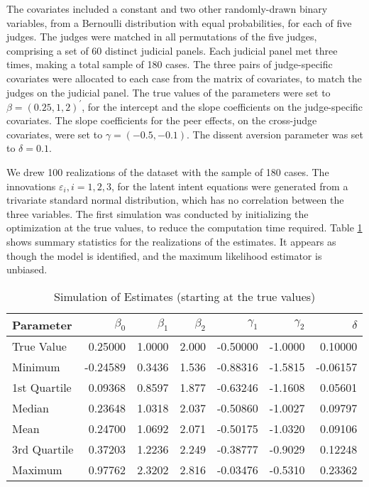 \documentclass[11pt]{paper}
\begin{document}
The covariates included a constant and two other randomly-drawn 
binary variables, from a Bernoulli distribution with equal probabilities, 
for each of five judges. 
The judges were matched in all permutations of the five judges, 
comprising a set of 60 distinct judicial panels. 
Each judicial panel met three times, making a total sample of 180 cases. 
The three pairs of judge-specific covariates were allocated to each case from
the matrix of covariates, to match the judges on the judicial panel. 
The true values of the parameters were set to
$\beta = (0.25, 1, 2)^{\prime}$, for the intercept 
and the slope coefficients on the judge-specific covariates. 
The slope coefficients for the peer effects, on the cross-judge covariates, 
were set to $\gamma = (-0.5, -0.1)$. 
The dissent aversion parameter was set to $\delta = 0.1$. 

We drew 100 realizations of the dataset with the sample of 180 cases.
The innovations $\varepsilon_i, i = 1, 2, 3$, for the latent intent equations
were generated from a trivariate standard normal distribution, 
which has no correlation between the three variables. 
The first simulation was conducted by 
initializing the optimization at the true values, 
to reduce the computation time required. 
Table \ref{tab:sim_warm} shows summary statistics 
for the realizations of the estimates. 
It appears as though the model is identified, 
and the maximum likelihood estimator is unbiased. 
% 
\begin{table}[ht]
\centering
\begin{tabular}{l r r r r r r}
  \hline
	Parameter 	& $\beta_0$	& $\beta_1$	& $\beta_2$	& $\gamma_1$	& $\gamma_2$	& $\delta$ \\ 
  \hline
	True Value 	&  0.25000 	&   1.0000 	&   2.000 		&  -0.50000 		&   -1.0000 		&   0.10000  \\
  \hline
 	Minimum		&  -0.24589   	&   0.3436   	&   1.536   	&   -0.88316   	&   -1.5815   		&   -0.06157 \\
 	1st Quartile	&  0.09368   	&   0.8597   	&   1.877   	&   -0.63246   	&   -1.1608   		&    0.05601 \\
 	Median 		&  0.23648   	&   1.0318   	&   2.037   	&   -0.50860   	&   -1.0027   		&    0.09797 \\
 	Mean   		&  0.24700   	&   1.0692   	&   2.071   	&   -0.50175   	&   -1.0320   		&    0.09106 \\
 	3rd Quartile	&  0.37203   	&   1.2236   	&   2.249   	&   -0.38777   	&   -0.9029   		&    0.12248 \\
 	Maximum   	&  0.97762   	&   2.3202   	&   2.816   	&   -0.03476   	&   -0.5310   		&    0.23362 \\
   \hline
\end{tabular}
\caption{Simulation of Estimates (starting at the true values)} 
\label{tab:sim_warm}
\end{table}
\end{document}
